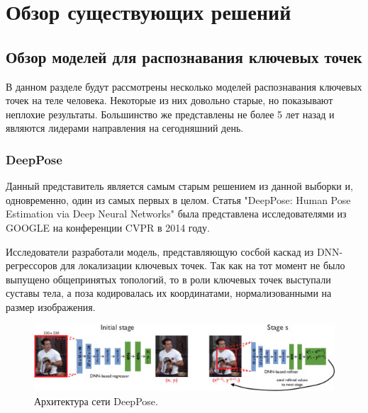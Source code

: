 \section{Обзор существующих решений}
\label{sec:Chapter4} 



\subsection{Обзор моделей для распознавания ключевых точек}
\label{sec:Chapter4_PE}

В данном разделе будут рассмотрены несколько моделей распознавания ключевых точек на теле человека. Некоторые из них довольно старые, но показывают неплохие результаты. Большинство же представлены не более 5 лет назад и являются лидерами направления на сегодняшний день.

\subsubsection*{DeepPose}

Данный представитель является самым старым решением из данной выборки и, одновременно, один из самых первых в целом. Статья "DeepPose: Human Pose Estimation via Deep Neural Networks"   \cite{DeepPose} была представлена исследователями из GOOGLE на конференции CVPR в 2014 году.

Исследователи разработали модель, представляющую сосбой каскад из DNN-регрессоров для локализации ключевых точек. Так как на тот момент не было выпущено общепринятых топологий, то в роли ключевых точек выступали суставы тела, а поза кодировалась их координатами, нормализованными на размер изображения.

\begin{figure}[h]
	\centering
	\includegraphics[width=\textwidth]{./images/DeepPose}
	\caption{Архитектура сети DeepPose. \cite{DeepPose}}
	\label{fig:dp_architecture}
\end{figure}

